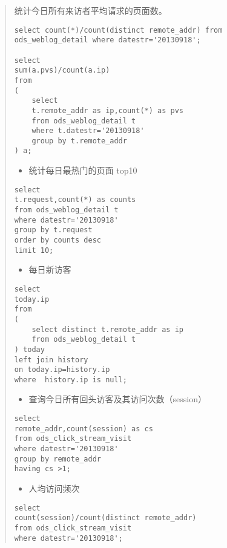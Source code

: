 \begin{quote}
统计今日所有来访者平均请求的页面数。

\begin{verbatim}
select count(*)/count(distinct remote_addr) from ods_weblog_detail where datestr='20130918';

select
sum(a.pvs)/count(a.ip)
from
(
    select
    t.remote_addr as ip,count(*) as pvs
    from ods_weblog_detail t
    where t.datestr='20130918'
    group by t.remote_addr
) a;
\end{verbatim}

\begin{itemize}
\item
  统计每日最热门的页面 top10
\end{itemize}

\begin{verbatim}
select 
t.request,count(*) as counts
from ods_weblog_detail t
where datestr='20130918'
group by t.request
order by counts desc
limit 10;
\end{verbatim}

\begin{itemize}
\item
  每日新访客
\end{itemize}

\begin{verbatim}
select 
today.ip
from 
(
    select distinct t.remote_addr as ip 
    from ods_weblog_detail t
) today 
left join history
on today.ip=history.ip
where  history.ip is null;
\end{verbatim}

\begin{itemize}
\item
  查询今日所有回头访客及其访问次数（session）
\end{itemize}

\begin{verbatim}
select
remote_addr,count(session) as cs
from ods_click_stream_visit
where datestr='20130918'
group by remote_addr
having cs >1;
\end{verbatim}

\begin{itemize}
\item
  人均访问频次
\end{itemize}

\begin{verbatim}
select 
count(session)/count(distinct remote_addr)
from ods_click_stream_visit
where datestr='20130918';
\end{verbatim}


\end{quote}
